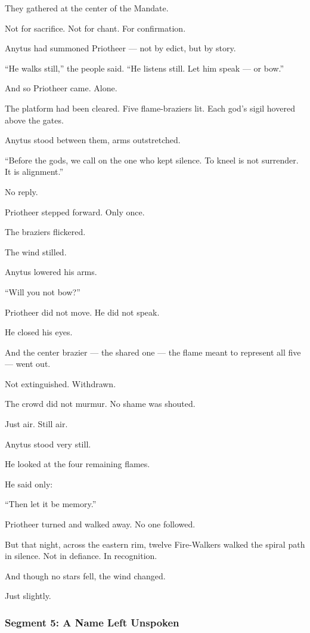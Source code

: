 \documentclass[9pt]{article}
\begin{document}
They gathered at the center of the Mandate.

Not for sacrifice.  
Not for chant.  
For confirmation.

Anytus had summoned Priotheer — not by edict,  
but by story.

 “He walks still,” the people said.  
 “He listens still.  
 Let him speak — or bow.”

And so Priotheer came.  
Alone.

The platform had been cleared.  
Five flame-braziers lit.  
Each god’s sigil hovered above the gates.

Anytus stood between them, arms outstretched.

 “Before the gods, we call on the one who kept silence.  
 To kneel is not surrender.  
It is alignment.”

No reply.

Priotheer stepped forward.  
Only once.

The braziers flickered.

The wind stilled.

Anytus lowered his arms.

 “Will you not bow?”

Priotheer did not move.  
He did not speak.

He closed his eyes.

And the center brazier — the shared one —  
the flame meant to represent all five —  
went out.

Not extinguished.  
Withdrawn.

The crowd did not murmur.  
No shame was shouted.

Just air.  
Still air.

Anytus stood very still.

He looked at the four remaining flames.

He said only:

 “Then let it be memory.”

Priotheer turned and walked away.  
No one followed.

But that night, across the eastern rim,  
twelve Fire-Walkers walked the spiral path in silence.  
Not in defiance.  
In recognition.

And though no stars fell,  
the wind changed.

Just slightly.

\newpage

\subsubsection*{Segment 5: A Name Left Unspoken}
\end{document}

